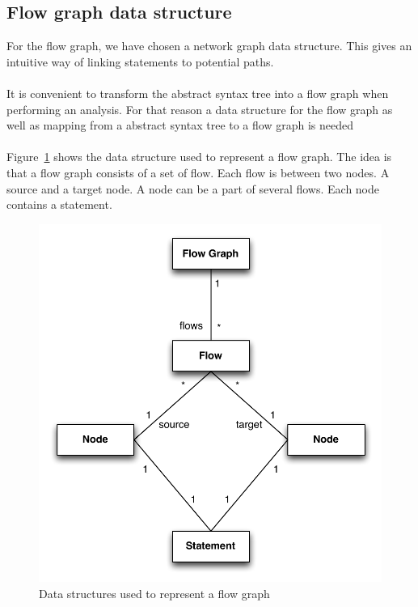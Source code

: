 \subsection{Flow graph data structure}
\label{sec:constructing_flow_graphs}
For the flow graph, we have chosen a network graph data structure. This gives an intuitive way of linking statements to potential paths.
\\
\\
It is convenient to transform the abstract syntax tree into a flow graph when performing an analysis. For that reason a data structure for the flow graph as well as mapping from a abstract syntax tree to a flow graph is needed 
\\
\\
Figure~\ref{fig:flowgraph} shows the data structure used to represent a flow graph. The idea is that a flow graph consists of a set of flow. Each flow is between two nodes. A source and a target node. A node can be a part of several flows. Each node contains a statement.	

\begin{figure}[h]
	\centering
	\includegraphics[scale=0.6]{../img/flow_graph}
	\caption{Data structures used to represent a flow graph}
	\label{fig:flowgraph}
\end{figure}


